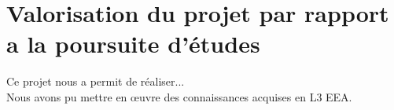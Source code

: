 \documentclass[a4paper]{report}
\begin{document}
	\chapter{Valorisation du projet par rapport a la poursuite d'études}
	
		Ce projet nous a permit de réaliser... \\
		Nous avons pu mettre en œuvre des connaissances acquises en L3 EEA.\\
	
 
	
	\renewcommand{\bibname}{Références} %
\end{document}
